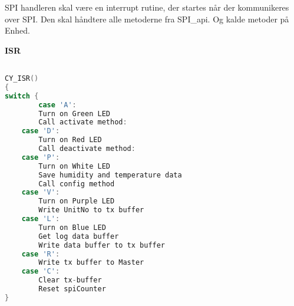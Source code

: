 
SPI handleren skal være en interrupt rutine, der startes når der kommunikeres over SPI. Den skal håndtere alle metoderne fra SPI\_api. Og kalde metoder på Enhed.

\textbf{ISR}

\begin{lstlisting}[language=C]

CY_ISR()
{
switch {
    	case 'A':
		Turn on Green LED
		Call activate method:                
	case 'D':
		Turn on Red LED
		Call deactivate method:  
	case 'P':
		Turn on White LED			
		Save humidity and temperature data            
		Call config method
	case 'V':
		Turn on Purple LED  
		Write UnitNo to tx buffer  
	case 'L':
		Turn on Blue LED
		Get log data buffer
		Write data buffer to tx buffer
	case 'R':
		Write tx buffer to Master
	case 'C':
		Clear tx-buffer
		Reset spiCounter 
}
\end{lstlisting}